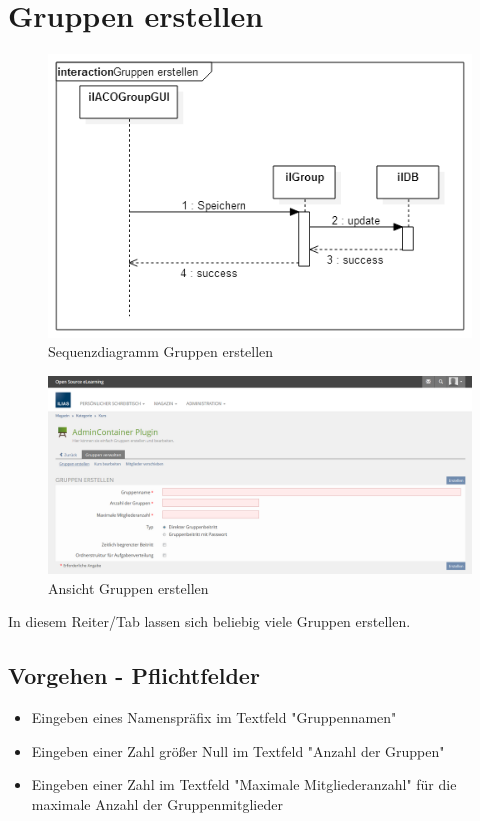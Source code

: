 \section{Gruppen erstellen}
\begin{figure}[h!]
	\centering
	\includegraphics[width=.75\textwidth]{img/seq_groupGUI.png}
	\caption{Sequenzdiagramm Gruppen erstellen}
\end{figure}
\begin{figure}[h!]
	\centering
	\includegraphics[width=1\textwidth]{img/gruppenErstellen.png}
	\caption{Ansicht Gruppen erstellen}
\end{figure}

In diesem Reiter/Tab lassen sich beliebig viele Gruppen erstellen. 
\newpage
\subsection*{Vorgehen - Pflichtfelder}

\begin{itemize}
	\item Eingeben eines Namenspräfix im Textfeld "Gruppennamen"  
	\item Eingeben einer Zahl größer Null im Textfeld "Anzahl der Gruppen"
	\item Eingeben einer Zahl im Textfeld "Maximale Mitgliederanzahl" für die maximale Anzahl der Gruppenmitglieder 
\end{itemize}




